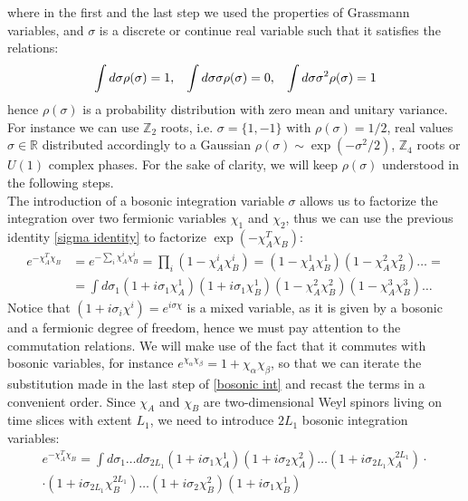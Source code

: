 where in the first and the last step we used the properties of Grassmann variables, and $\sigma$ is a discrete or continue real variable such that it satisfies the relations:
\begin{equation}
    \int d\sigma \rho(\sigma) = 1, \hspace{3mm} \int d\sigma \sigma \rho(\sigma) = 0, \hspace{3mm}\int d\sigma \sigma^2 \rho(\sigma) = 1
\end{equation}
hence $\rho(\sigma)$ is a probability distribution with zero mean and unitary variance. For instance we can use $\mathbb{Z}_2$ roots, i.e. $\sigma = \{1, -1\}$ with $\rho(\sigma) = 1/2$, real values $\sigma \in \mathbb{R}$ distributed accordingly to a Gaussian $\rho(\sigma) \sim \exp(-\sigma^2/2)$, $\mathbb{Z}_4$ roots or $U(1)$ complex phases. For the sake of clarity, we will keep $\rho(\sigma)$ understood in the following steps.
\\ The introduction of a bosonic integration variable $\sigma$ allows us to factorize the integration over two fermionic variables $\chi_1$ and $\chi_2$, thus we can use the previous identity \eqref{sigma identity} to factorize $\exp(-\chi_A^T \chi_B)$:
\begin{equation}\label{bosonic int}
    \begin{split}
        e^{-\chi_A^T \chi_B} &= e^{- \sum_i \chi_A^i \chi_B^i} = \prod_i (1 - \chi_A^i \chi_B^i) = (1 - \chi_A^1 \chi_B^1) (1 - \chi_A^2 \chi_B^2) \dots = 
        \\ 
        &= \int d\sigma_1 (1 + i\sigma_1 \chi_A^1) (1 + i \sigma_1 \chi_B^1) (1 - \chi_A^2 \chi_B^2) (1 - \chi_A^3 \chi_B^3) \dots 
    \end{split}
\end{equation}
Notice that $(1 + i \sigma_i \chi^i) = e^{i\sigma\chi}$ is a mixed variable, as it is given by a bosonic and a fermionic degree of freedom, hence we must pay attention to the commutation relations. We will make use of the fact that it commutes with bosonic variables, for instance $e^{\chi_\alpha \chi_\beta} = 1 + \chi_\alpha \chi_\beta$, so that we can iterate the substitution made in the last step of \eqref{bosonic int} and recast the terms in a convenient order. Since $\chi_A$ and $\chi_B$ are two-dimensional Weyl spinors living on time slices with extent $L_1$, we need to introduce $2L_1$ bosonic integration variables:
\begin{equation}\label{integrand}
\begin{split}
        e^{-\chi_A^T \chi_B} = \int d\sigma_1 \dots d\sigma_{2L_1} (1 + i \sigma_1 \chi_A^1) (1 + i \sigma_2 \chi_A^2) \dots  (1 + i \sigma_{2L_1} \chi_A^{2L_1}) \cdot \\ \cdot (1 + i \sigma_{2L_1} \chi_B^{2L_1}) \dots (1 + i \sigma_2 \chi_B^2)(1 + i \sigma_1 \chi_B^1)
\end{split}
\end{equation}
